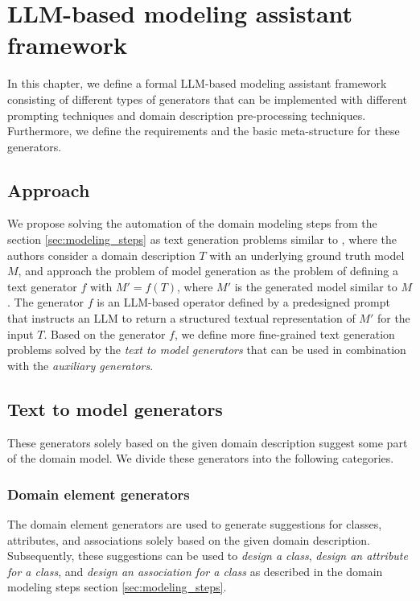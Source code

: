 \chapter{LLM-based modeling assistant framework}
\label{chap:framework}

In this chapter, we define a formal LLM-based modeling assistant framework consisting of different types of generators that can be implemented with different prompting techniques and domain description pre-processing techniques. Furthermore, we define the requirements and the basic meta-structure for these generators.


\section{Approach}

We propose solving the automation of the domain modeling steps from the section \ref{sec:modeling_steps} as text generation problems similar to \citet{Chen2023}, where the authors consider a domain description $T$ with an underlying ground truth model $M$, and approach the problem of model generation as the problem of defining a text generator $f$ with $M' = f(T)$, where $M'$ is the generated model similar to $M$. The generator $f$ is an LLM-based operator defined by a predesigned prompt that instructs an LLM to return a structured textual representation of $M'$ for the input $T$. Based on the generator $f$, we define more fine-grained text generation problems solved by the \emph{text to model generators} that can be used in combination with the \emph{auxiliary generators}.


\section{Text to model generators}

These generators solely based on the given domain description suggest some part of the domain model. We divide these generators into the following categories.


\subsection{Domain element generators}

The domain element generators are used to generate suggestions for classes, attributes, and associations solely based on the given domain description. Subsequently, these suggestions can be used to \emph{design a class}, \emph{design an attribute for a class}, and \emph{design an association for a class} as described in the domain modeling steps section \ref{sec:modeling_steps}.

